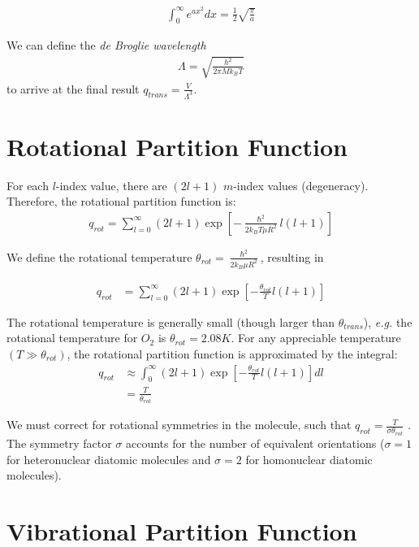 \documentclass[book.tex]{subfiles}
\begin{document}
\begin{align}
\int_0^\infty e^{ax^2} dx = \frac{1}{2}\sqrt{\frac{\pi}{a}}
\end{align}

We can define the \textit{de Broglie wavelength} 
\begin{align}
\Lambda = \sqrt{\frac{h^2}{2\pi Mk_BT}}
\end{align}
to arrive at the final result $q_{trans} = \frac{V}{\Lambda^3}$.

\section{Rotational Partition Function}

For each $l$-index value, there are $(2l+1)$ $m$-index values (degeneracy).
Therefore, the rotational partition function is:
\begin{align}\label{part_rot}
q_{rot}=\sum_{l=0}^\infty (2l+1)\exp \left[-\frac{\hslash^2}{2k_BT\mu R^2}l(l+1)\right]
\end{align}

We define the rotational temperature $\theta_{rot}=\frac{\hslash^2}{2k_B\mu R^2}$, resulting in 

\begin{align}
q_{rot} &= \sum_{l=0}^\infty (2l+1)\exp\left[-\frac{\theta_{rot}}{T}l(l+1)\right]
\end{align} 

The rotational temperature is generally small (though larger than $\theta_{trans}$), \textit{e.g.} the rotational temperature for $O_2$ is $\theta_{rot}=2.08K$. 
For any appreciable temperature $(T\gg \theta_{rot})$, the rotational partition
function is approximated by the integral:
\begin{align}\label{part_rot_simple}
q_{rot} &\approx \int_0^\infty (2l+1) \exp \left[-\frac{\theta_{rot}}{T}l(l+1)\right] dl \\
&= \frac{T}{\theta_{rot}}
\end{align}

We must correct for rotational symmetries in the molecule, such that $q_{rot} = \frac{T}{\sigma \theta_{rot}}$ . The symmetry factor $\sigma$ accounts for the number
of equivalent orientations ($\sigma = 1$ for heteronuclear diatomic molecules and $\sigma = 2$ for homonuclear diatomic molecules).

\section{Vibrational Partition Function}
\end{document}
